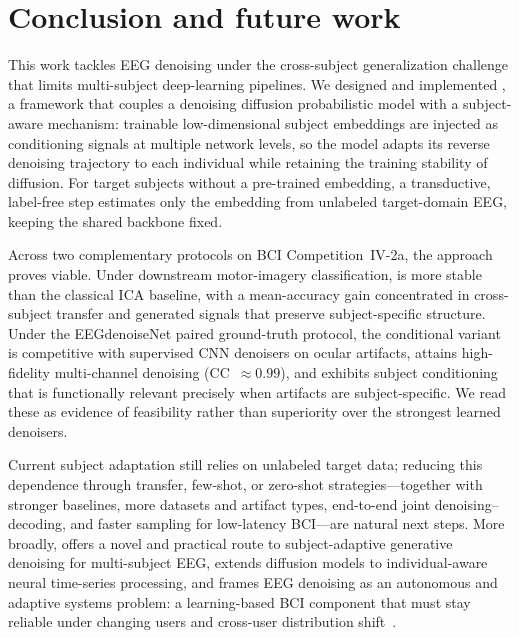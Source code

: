 \section{Conclusion and future work}
\label{sec:conclusion}

This work tackles EEG denoising under the cross-subject generalization challenge that limits multi-subject deep-learning pipelines. We designed and implemented \saddpm{}, a framework that couples a denoising diffusion probabilistic model with a subject-aware mechanism: trainable low-dimensional subject embeddings are injected as conditioning signals at multiple network levels, so the model adapts its reverse denoising trajectory to each individual while retaining the training stability of diffusion. For target subjects without a pre-trained embedding, a transductive, label-free step estimates only the embedding from unlabeled target-domain EEG, keeping the shared backbone fixed.

Across two complementary protocols on BCI Competition~IV-2a, the approach proves viable. Under downstream motor-imagery classification, \saddpm{} is more stable than the classical ICA baseline, with a mean-accuracy gain concentrated in cross-subject transfer and generated signals that preserve subject-specific structure. Under the EEGdenoiseNet paired ground-truth protocol, the conditional variant \saddpmcond{} is competitive with supervised CNN denoisers on ocular artifacts, attains high-fidelity multi-channel denoising (CC~$\approx0.99$), and exhibits subject conditioning that is functionally relevant precisely when artifacts are subject-specific. We read these as evidence of feasibility rather than superiority over the strongest learned denoisers.

Current subject adaptation still relies on unlabeled target data; reducing this dependence through transfer, few-shot, or zero-shot strategies---together with stronger baselines, more datasets and artifact types, end-to-end joint denoising--decoding, and faster sampling for low-latency BCI---are natural next steps. More broadly, \saddpm{} offers a novel and practical route to subject-adaptive generative denoising for multi-subject EEG, extends diffusion models to individual-aware neural time-series processing, and frames EEG
denoising as an autonomous and adaptive systems problem: a learning-based BCI component that must stay reliable under changing users and cross-user
distribution shift~\cite{casimiro2024selfadapting}.